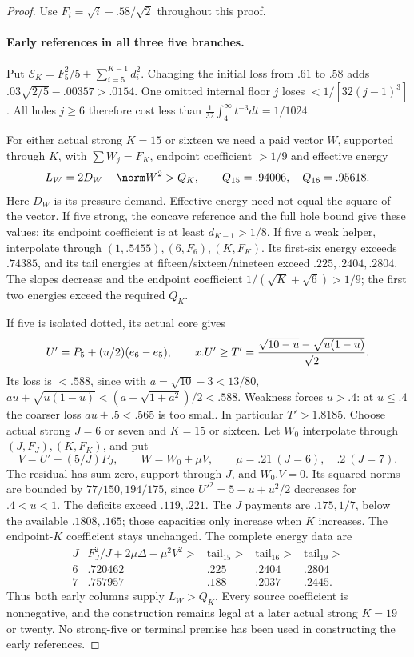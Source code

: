 \begin{proof}
Use $F_i=\sqrt i-.58/\sqrt2$ throughout this proof.

\paragraph{Early references in all three five branches.}
Put $\mathcal E_K=F_5^2/5+\sum_{i=5}^{K-1}d_i^2$.
Changing the initial loss from $.61$ to $.58$ adds
$ .03\sqrt{2/5}-.00357>.0154$.
One omitted internal floor $j$ loses $<1/[32(j-1)^3]$.
All holes $j\ge6$ therefore cost less than
$\frac1{32}\int_4^\infty t^{-3}dt=1/1024$.

For either actual strong $K=15$ or sixteen we need a paid vector
$W$, supported through $K$, with $\sum W_j=F_K$, endpoint
coefficient $>1/9$ and effective energy
\[
 L_W=2D_W-\norm W^2>Q_K,\qquad Q_{15}=.94006,\quad Q_{16}=.95618.
\]
Here $D_W$ is its pressure demand. Effective energy need not equal
the square of the vector.
If five strong, the concave reference and the full hole bound give
these values; its endpoint coefficient is at least $d_{K-1}>1/8$.
If five a weak helper, interpolate through $(1,.5455),(6,F_6),(K,F_K)$.
Its first-six energy exceeds $.74385$, and its tail energies at
fifteen/sixteen/nineteen exceed $.225,.2404,.2804$.
The slopes decrease and the endpoint coefficient
$1/(\sqrt K+\sqrt6)>1/9$; the first two energies exceed the required
$Q_K$.

If five is isolated dotted, its actual core gives
\[
 U'=P_5+(u/2)(e_6-e_5),\qquad
 x.U'\ge T'={\sqrt{10-u}-\sqrt{u(1-u)}\over\sqrt2}.
\]
Its loss is $<.588$, since with $a=\sqrt{10}-3<13/80$,
$au+\sqrt{u(1-u)}<(a+\sqrt{1+a^2})/2<.588$.
Weakness forces $u>.4$: at $u\le.4$ the coarser loss
$au+.5<.565$ is too small. In particular $T'>1.8185$.
Choose actual strong $J=6$ or seven and $K=15$ or sixteen.
Let $W_0$ interpolate through $(J,F_J),(K,F_K)$, and put
\[
 V=U'-(5/J)P_J,\qquad W=W_0+\mu V,
 \qquad \mu=.21\ (J=6),\quad .2\ (J=7).
\]
The residual has sum zero, support through $J$, and $W_0.V=0$.
Its squared norms are bounded by $77/150,194/175$, since
$U'^2=5-u+u^2/2$ decreases for $.4<u<1$.
The deficits exceed $.119,.221$. The $J$ payments are $.175,1/7$,
below the available $.1808,.165$; those capacities only increase
when $K$ increases. The endpoint-$K$ coefficient stays unchanged.
The complete energy data are
\[
\begin{array}{c|c|c|c|c}
J&F_J^2/J+2\mu\Delta-\mu^2V^2>&\text{tail}_{15}>&
 \text{tail}_{16}>&\text{tail}_{19}>\\\hline
6&.720462&.225&.2404&.2804\\7&.757957&.188&.2037&.2445 .
\end{array}
\]
Thus both early columns supply $L_W>Q_K$. Every source coefficient
is nonnegative, and the construction remains legal at a later actual
strong $K=19$ or twenty. No strong-five or terminal premise has been
used in constructing the early references.


\end{proof}

